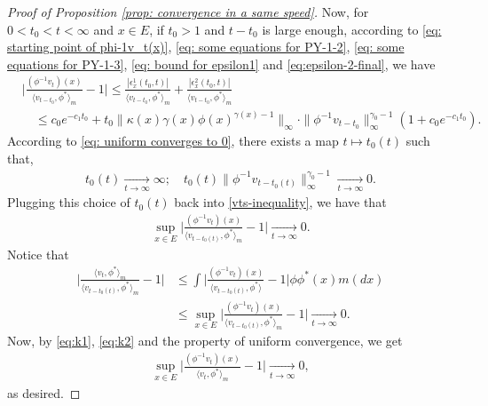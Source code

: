 \begin{proof}[Proof of Proposition \ref{prop: convergence in a same speed}]
	Now, for $0<t_0<t<\infty$ and $x\in E$, if $t_0 > 1$ and $t-t_0$ is large enough, according to \eqref{eq: starting point of phi-1v_t(x)}, \eqref{eq: some equations for PY-1-2}, \eqref{eq: some equations for PY-1-3}, \eqref{eq: bound for epsilon1} and \eqref{eq:epsilon-2-final}, we have
\begin{align} \label{vts-inequality}
	&\Big|\frac{(\phi^{-1}v_t)(x)}{\langle v_{t-t_0},\phi^* \rangle_m}-1 \Big|
	\leq \frac{|\epsilon_x^1(t_0,t)|}{\langle v_{t-t_0},\phi^* \rangle_m} + \frac{|\epsilon_x^2(t_0,t)|}{\langle v_{t-t_0},\phi^* \rangle_m}\\
	&\quad \leq c_0e^{-c_1 t_0} +t_0\|\kappa(x)\gamma(x)\phi(x)^{\gamma(x) - 1}\|_{\infty}
	\cdot \|\phi^{-1}v_{t-t_0}\|^{\gamma_0-1}_\infty (1+c_0 e^{-c_1 t_0}).
\end{align}
	According to \eqref{eq: uniform converges to 0}, there exists a map $t\mapsto t_0(t)$ such that,
\begin{align}
	t_0(t)
	\xrightarrow[t\to\infty]{} \infty;
	\quad t_0(t)\| \phi^{-1}v_{t-t_0(t)}\|^{\gamma_0 - 1}_\infty
	\xrightarrow[t\to\infty]{} 0.
\end{align}
	Plugging this choice of $t_0(t)$ back into \eqref{vts-inequality}, we have that
\begin{align}\label{eq:k1}
	\sup_{x\in E}\Big|\frac{(\phi^{-1}v_t)(x)}{\langle v_{t-t_0(t)},\phi^* \rangle_m}-1 \Big|
	\xrightarrow[t\to\infty]{} 0.
\end{align}
	Notice that
\begin{align}\label{eq:k2}
	\Big |\frac {\langle v_t, \phi^*\rangle_m} {\langle v_{t-t_0(t)} , \phi^*\rangle_m} - 1 \Big |
	&\leq \int \Big | \frac{(\phi^{-1}v_t)(x)}{\langle v_{t-t_0(t)} , \phi^*\rangle} - 1 \Big| \phi \phi^*(x) m(dx)\\
	&\leq \sup_{x\in E}\Big|\frac{(\phi^{-1}v_t)(x)}{\langle v_{t-t_0(t)},\phi^* \rangle_m}-1 \Big|
	\xrightarrow[t\to\infty]{} 0.
\end{align}
	Now, by \eqref{eq:k1}, \eqref{eq:k2} and the property of uniform convergence, we get
\begin{align}
	\sup_{x\in E}\Big|\frac{(\phi^{-1}v_t)(x)}{\langle v_{t},\phi^* \rangle_m}-1 \Big|
	\xrightarrow[t\to\infty]{} 0,
\end{align}
	as desired.
\end{proof}

